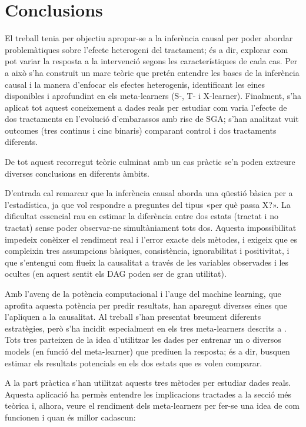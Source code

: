 \documentclass[../main.tex]{subfiles}
\begin{document}
 

\chapter{Conclusions} \label{ch:conclu}

El treball tenia per objectiu apropar-se a la inferència causal per poder abordar problemàtiques sobre l’efecte heterogeni del tractament; és a dir, explorar com pot variar la resposta a la intervenció segons les característiques de cada cas. Per a això s’ha construït un marc teòric que pretén entendre les bases de la inferència causal i la manera d’enfocar els efectes heterogenis, identificant les eines disponibles i aprofundint en els meta-learners (S-, T- i X-learner). Finalment, s’ha aplicat tot aquest coneixement a dades reals per estudiar com varia l’efecte de dos tractaments en l’evolució d’embarassos amb risc de SGA; s’han analitzat vuit outcomes (tres continus i cinc binaris) comparant control i dos tractaments diferents.\par
De tot aquest recorregut teòric culminat amb un cas pràctic se’n poden extreure diverses conclusions en diferents àmbits.\par
D’entrada cal remarcar que la inferència causal aborda una qüestió bàsica per a l’estadística, ja que vol respondre a preguntes del tipus «per què passa X?». La dificultat essencial rau en estimar la diferència entre dos estats (tractat i no tractat) sense poder observar-ne simultàniament tots dos. Aquesta impossibilitat impedeix conèixer el rendiment real i l’error exacte dels mètodes, i exigeix que es compleixin tres assumpcions bàsiques, consistència, ignorabilitat i positivitat, i que s’entengui com flueix la causalitat a través de les variables observades i les ocultes (en aquest sentit els DAG poden ser de gran utilitat). \par
Amb l’avenç de la potència computacional i l’auge del machine learning, que aprofita aquesta potència per predir resultats, han aparegut diverses eines que l’apliquen a la causalitat. Al treball s’han presentat breument diferents estratègies, però s’ha incidit especialment en els tres meta-learners descrits a \citealp{kunzel2019}. Tots tres parteixen de la idea d’utilitzar les dades per entrenar un o diversos models (en funció del meta-learner) que prediuen la resposta; és a dir, busquen estimar els resultats potencials en els dos estats que es volen comparar.\par
A la part pràctica s'han utilitzat aquests tres mètodes per estudiar dades reals. Aquesta aplicació ha permès entendre les implicacions tractades a la secció més teòrica i, alhora, veure el rendiment dels meta-learners per fer-se una idea de com funcionen i quan és millor cadascun:
\end{document}
